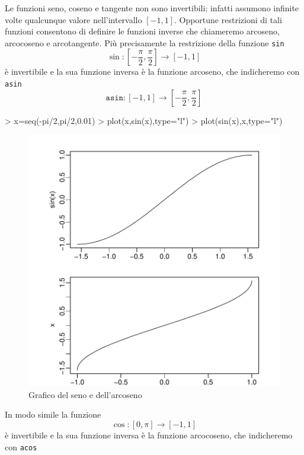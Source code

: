 \documentclass[onecolumn,11pt]{book}
\begin{document}
Le funzioni seno, coseno e tangente non sono invertibili; infatti assumono infinite volte qualcunque valore nell'intervallo $[-1,1]$.
Opportune restrizioni di tali funzioni consentono di  definire le funzioni inverse che chiameremo arcoseno, arcocoseno e arcotangente. Pi\`u precisamente
la restrizione della funzione \texttt{sin}
$$\sin\colon [-\frac{\pi}{2},\frac{\pi}{2}]\rightarrow [-1,1]$$
\`e invertibile e la sua funzione inversa \`e  la funzione arcoseno, che indicheremo con \texttt{asin}
$$\texttt{asin}\colon  [-1,1]\rightarrow [-\frac{\pi}{2},\frac{\pi}{2}]$$
\begin{Schunk}
\begin{Sinput}
> x=seq(-pi/2,pi/2,0.01)
> plot(x,sin(x),type="l")
> plot(sin(x),x,type="l")
\end{Sinput}
\end{Schunk}
\begin{center}\begin{figure}

\includegraphics{Rmatematica-097}
\caption{Grafico del seno e dell'arcoseno}
\end{figure}

\end{center}
In modo simile la funzione
$$\cos\colon [0,\pi]\rightarrow [-1,1]$$
 \`e invertibile e la sua funzione inversa \`e  la funzione arcocoseno, che indicheremo con \texttt{acos}
\end{document}
